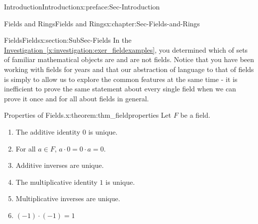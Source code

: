 \documentclass[oneside,10pt,]{book}
\newcommand{\xreffont}{\relax}
\numberwithin{equation}{section}
\begin{document}
\begin{preface}{Introduction}{}{Introduction}{}{}{x:preface:Sec-Introduction}
\begin{chapterptx}{Fields and Rings}{}{Fields and Rings}{}{}{x:chapter:Sec-Fields-and-Rings}
\begin{sectionptx}{Fields}{}{Fields}{}{}{x:section:SubSec-Fields}
In the \hyperref[x:investigation:exer_fieldexamples]{Investigation~{\xreffont\ref{x:investigation:exer_fieldexamples}}}, you determined which of sets of familiar mathematical objects are and are not fields. Notice that you have been working with fields for years and that our abstraction of language to that of fields is simply to allow us to explore the common features at the same time - it is inefficient to prove the same statement about every single field when we can prove it once and for all about fields in general.%
\begin{theorem}{Properties of Fields.}{}{x:theorem:thm_fieldproperties}%
Let \(F\) be a field.%
\begin{enumerate}
\item{}The additive identity \(0\) is unique.%
\item{}For all \(a\in F\), \(a \cdot 0 = 0\cdot a = 0\).%
\item{}Additive inverses are unique.%
\item{}The multiplicative identity \(1\) is unique.%
\item{}Multiplicative inverses are unique.%
\item{}\((-1)\cdot (-1) = 1\) 


\end{enumerate}
\end{theorem}
\end{sectionptx}
\end{chapterptx}
\end{preface}
\end{document}
